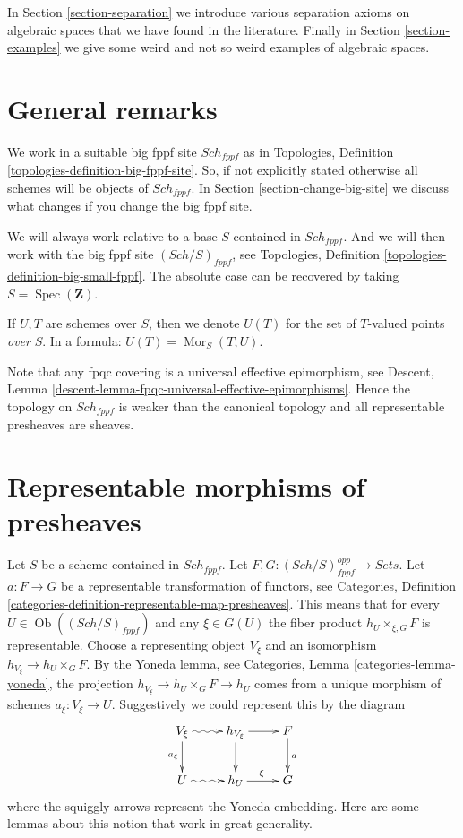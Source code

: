 \documentclass{stacks-project}
\theoremstyle{plain}
\theoremstyle{definition}
\theoremstyle{remark}
\numberwithin{equation}{subsection}
\def\Spec{\mathop{\mathrm{Spec}}}
\def\Sch{\mathit{Sch}}
\def\Mor{\mathop{\mathrm{Mor}}\nolimits}
\def\Ob{\mathop{\mathrm{Ob}}\nolimits}
\begin{document}
\medskip\noindent
In Section \ref{section-separation} we introduce various separation
axioms on algebraic spaces that we have found in the literature.
Finally in Section \ref{section-examples}
we give some weird and not so weird examples of algebraic spaces.






\section{General remarks}
\label{section-general}

\noindent
We work in a suitable big fppf site $\Sch_{fppf}$
as in Topologies, Definition \ref{topologies-definition-big-fppf-site}.
So, if not explicitly stated otherwise all schemes will be objects
of $\Sch_{fppf}$.
In Section \ref{section-change-big-site} we discuss what
changes if you change the big fppf site.

\medskip\noindent
We will always work relative to a base $S$ contained in $\Sch_{fppf}$.
And we will then work with the big fppf site $(\Sch/S)_{fppf}$,
see Topologies, Definition \ref{topologies-definition-big-small-fppf}.
The absolute case can be recovered by taking
$S = \Spec(\mathbf{Z})$.

\medskip\noindent
If $U, T$ are schemes over $S$, then we denote
$U(T)$ for the set of $T$-valued points {\it over} $S$.
In a formula: $U(T) = \Mor_S(T, U)$.

\medskip\noindent
Note that any fpqc covering is a universal effective epimorphism, see
Descent, Lemma \ref{descent-lemma-fpqc-universal-effective-epimorphisms}.
Hence the topology on $\Sch_{fppf}$
is weaker than the canonical topology and all representable presheaves
are sheaves.







\section{Representable morphisms of presheaves}
\label{section-representable}

\noindent
Let $S$ be a scheme contained in $\Sch_{fppf}$.
Let $F, G : (\Sch/S)_{fppf}^{opp} \to \textit{Sets}$.
Let $a : F \to G$ be a representable transformation of functors, see
Categories,
Definition \ref{categories-definition-representable-map-presheaves}.
This means that for every
$U \in \Ob((\Sch/S)_{fppf})$ and
any $\xi \in G(U)$ the fiber product $h_U \times_{\xi, G} F$ is representable.
Choose a representing object $V_\xi$ and an isomorphism
$h_{V_\xi} \to h_U \times_G F$.
By the Yoneda lemma, see Categories, Lemma \ref{categories-lemma-yoneda},
the projection $h_{V_\xi} \to h_U \times_G F \to h_U$ comes from a unique
morphism of schemes $a_\xi : V_\xi \to U$.
Suggestively we could represent this by the diagram
$$
\xymatrix{
V_\xi \ar@{~>}[r] \ar[d]_{a_\xi} & h_{V_\xi} \ar[d] \ar[r] & F \ar[d]^a \\
U \ar@{~>}[r] & h_U \ar[r]^\xi & G
}
$$
where the squiggly arrows represent the Yoneda embedding.
Here are some lemmas about this notion that work in great generality.
\end{document}
